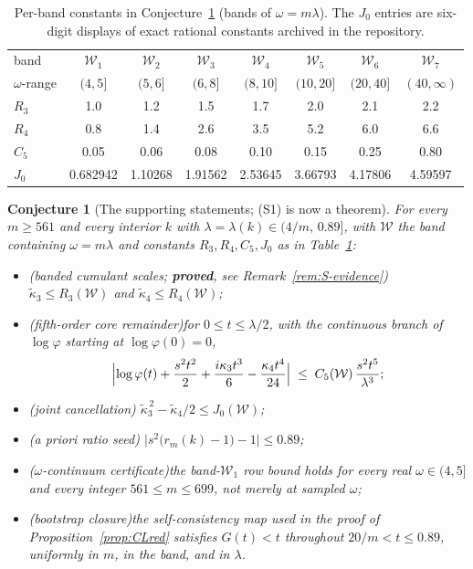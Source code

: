 \documentclass[11pt]{amsart}
\theoremstyle{plain}
\newtheorem{conjecture}[theorem]{Conjecture}
\theoremstyle{definition}
\theoremstyle{remark}
\begin{document}
\begin{table}[htbp]
\centering
\caption{Per-band constants in Conjecture~\ref{conj:S} (bands of
$\omega=m\lambda$). The $J_0$ entries are six-digit displays of exact
rational constants archived in the repository.}
\label{tab:CLbands}
\small
\begin{tabular}{@{}lccccccc@{}}
\toprule
band & $\mathcal W_1$ & $\mathcal W_2$ & $\mathcal W_3$ & $\mathcal W_4$ & $\mathcal W_5$ & $\mathcal W_6$ & $\mathcal W_7$ \\
$\omega$-range & $(4,5]$ & $(5,6]$ & $(6,8]$ & $(8,10]$ & $(10,20]$ & $(20,40]$ & $(40,\infty)$ \\
\midrule
$R_3$ & 1.0 & 1.2 & 1.5 & 1.7 & 2.0 & 2.1 & 2.2 \\
$R_4$ & 0.8 & 1.4 & 2.6 & 3.5 & 5.2 & 6.0 & 6.6 \\
$C_5$ & 0.05 & 0.06 & 0.08 & 0.10 & 0.15 & 0.25 & 0.80 \\
$J_0$ & 0.682942 & 1.10268 & 1.91562 & 2.53645 & 3.66793 & 4.17806 & 4.59597 \\
\bottomrule
\end{tabular}
\end{table}

\begin{conjecture}[The supporting statements; (S1) is now a theorem]
\label{conj:S}
For every $m\ge561$ and every interior $k$ with
$\lambda=\lambda(k)\in(4/m,\,0.89]$, with $\mathcal W$ the band containing
$\omega=m\lambda$ and constants $R_3,R_4,C_5,J_0$ as in
Table~\ref{tab:CLbands}:
\begin{itemize}
\item[(S1)] \emph{(banded cumulant scales; \textbf{proved}, see
Remark~\ref{rem:S-evidence})}\quad
$\tilde\kappa_3\le R_3(\mathcal W)$ and $\tilde\kappa_4\le R_4(\mathcal W)$;
\item[(S2)] \emph{(fifth-order core remainder)}\quad for
$0\le t\le\lambda/2$, with the continuous branch of $\log\varphi$
starting at $\log\varphi(0)=0$,
\[
\Bigl|\log\varphi(t)+\frac{s^2t^2}{2}+\frac{i\kappa_3t^3}{6}
-\frac{\kappa_4t^4}{24}\Bigr| \;\le\;
C_5(\mathcal W)\,\frac{s^2t^5}{\lambda^3};
\]
\item[(S3)] \emph{(joint cancellation)}\quad
$\tilde\kappa_3^{\,2}-\tilde\kappa_4/2\le J_0(\mathcal W)$;
\item[(S4)] \emph{(a priori ratio seed)}\quad
$\bigl|s^2\bigl(r_m(k)-1\bigr)-1\bigr|\le0.89$;
\item[(S5)] \emph{($\omega$-continuum certificate)}\quad the band-$\mathcal W_1$
row bound holds for every real $\omega\in(4,5]$ and every integer
$561\le m\le699$, not merely at sampled $\omega$;
\item[(S6)] \emph{(bootstrap closure)}\quad the self-consistency map used in
the proof of Proposition~\ref{prop:CLred} satisfies $G(t)<t$ throughout
$20/m<t\le0.89$, uniformly in $m$, in the band, and in $\lambda$.
\end{itemize}
\end{conjecture}
\end{document}
